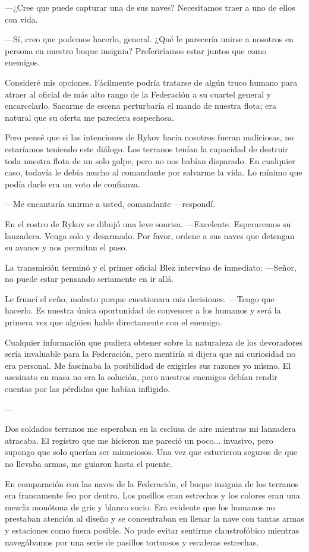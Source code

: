  —¿Cree que puede capturar una de sus naves? Necesitamos traer a uno de ellos con vida.

—Sí, creo que podemos hacerlo, general. ¿Qué le parecería unirse a nosotros en persona en nuestro buque insignia? Preferiríamos estar juntos que como enemigos.

Consideré mis opciones. Fácilmente podría tratarse de algún truco humano para atraer al oficial de más alto rango de la Federación a su cuartel general y encarcelarlo. Sacarme de escena perturbaría el mando de nuestra flota; era natural que su oferta me pareciera sospechosa.

Pero pensé que si las intenciones de Rykov hacia nosotros fueran maliciosas, no estaríamos teniendo este diálogo. Los terranos tenían la capacidad de destruir toda nuestra flota de un solo golpe, pero no nos habían disparado. En cualquier caso, todavía le debía mucho al comandante por salvarme la vida. Lo mínimo que podía darle era un voto de confianza.

—Me encantaría unirme a usted, comandante —respondí.

En el rostro de Rykov se dibujó una leve sonrisa. —Excelente. Esperaremos su lanzadera. Venga solo y desarmado. Por favor, ordene a sus naves que detengan su avance y nos permitan el paso.

La transmisión terminó y el primer oficial Blez intervino de inmediato: —Señor, no puede estar pensando seriamente en ir allá.

Le fruncí el ceño, molesto porque cuestionara mis decisiones. —Tengo que hacerlo. Es nuestra única oportunidad de convencer a los humanos y será la primera vez que alguien hable directamente con el enemigo.

Cualquier información que pudiera obtener sobre la naturaleza de los devoradores sería invaluable para la Federación, pero mentiría si dijera que mi curiosidad no era personal. Me fascinaba la posibilidad de exigirles sus razones yo mismo. El asesinato en masa no era la solución, pero nuestros enemigos debían rendir cuentas por las pérdidas que habían infligido.

---

Dos soldados terranos me esperaban en la esclusa de aire mientras mi lanzadera atracaba. El registro que me hicieron me pareció un poco... invasivo, pero supongo que solo querían ser minuciosos. Una vez que estuvieron seguros de que no llevaba armas, me guiaron hasta el puente.

En comparación con las naves de la Federación, el buque insignia de los terranos era francamente feo por dentro. Los pasillos eran estrechos y los colores eran una mezcla monótona de gris y blanco sucio. Era evidente que los humanos no prestaban atención al diseño y se concentraban en llenar la nave con tantas armas y estaciones como fuera posible. No pude evitar sentirme claustrofóbico mientras navegábamos por una serie de pasillos tortuosos y escaleras estrechas.

